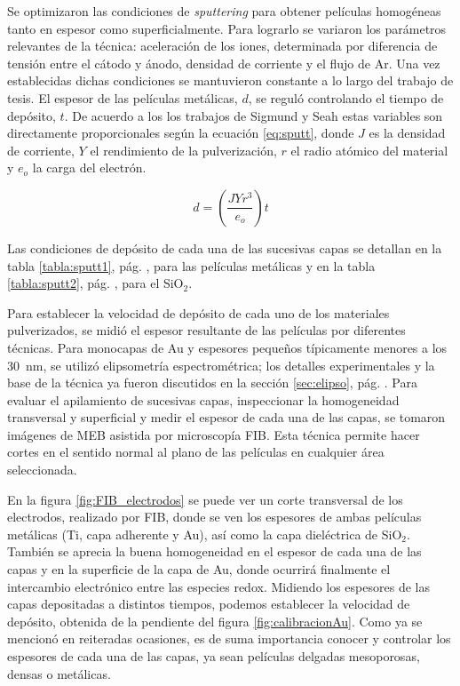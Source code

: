 {		 Se optimizaron las condiciones de \textit{sputtering} para obtener películas homogéneas tanto en espesor como superficialmente. Para lograrlo se variaron los parámetros relevantes de la técnica: aceleración de los iones, determinada por diferencia de tensión entre el cátodo y ánodo, densidad de corriente y el flujo de Ar. Una vez establecidas dichas condiciones se mantuvieron constante a lo largo del trabajo de tesis. El espesor de las películas metálicas, $d$, se reguló controlando el tiempo de depósito, $t$. De acuerdo a los los trabajos de Sigmund\cite{sigmund1968} y Seah\cite{Seah2005} estas variables son directamente proporcionales según la ecuación \ref{eq:sputt}, donde $J$ es la densidad de corriente, $Y$ el rendimiento de la pulverización, $r$ el radio atómico del material y $e_o$ la carga del electrón.

	 			\begin{equation}
	 				d=\left(\frac{JYr^3}{e_o}\right)t
	 				\label{eq:sputt}
	 			\end{equation}

		 Las condiciones de depósito de cada una de las sucesivas capas se detallan en la tabla \ref{tabla:sputt1}, pág. \pageref{tabla:sputt1}, para las películas metálicas y en la tabla  \ref{tabla:sputt2}, pág. \pageref{tabla:sputt2}, para el SiO$_2$. 

		 Para establecer la velocidad de depósito de cada uno de los materiales pulverizados, se midió el espesor resultante de las películas por diferentes técnicas. Para monocapas de Au y espesores pequeños típicamente menores a los \SI{30}{\nm}, se utilizó elipsometría espectrométrica; los detalles experimentales y la base de la técnica ya fueron discutidos en la sección \ref{sec:elipso}, pág. \pageref{sec:elipso}. Para evaluar el apilamiento de sucesivas capas, inspeccionar la homogeneidad transversal y superficial y medir el espesor de cada una de las capas, se tomaron imágenes de MEB asistida por microscopía FIB. Esta técnica permite hacer cortes en el sentido normal al plano de las películas en cualquier área seleccionada.
		
		 En la figura \ref{fig:FIB_electrodos} se puede ver un corte transversal de los electrodos, realizado por FIB, donde se ven los espesores de ambas películas metálicas (Ti, capa adherente y Au), así como la capa dieléctrica de SiO$_2$. También se aprecia la buena homogeneidad en el espesor de cada una de las capas y en la superficie de la capa de Au, donde ocurrirá finalmente el intercambio electrónico entre las especies redox. Midiendo los espesores de las capas depositadas a distintos tiempos, podemos establecer la velocidad de depósito, obtenida de la pendiente del figura \ref{fig:calibracionAu}. Como ya se mencionó en reiteradas ocasiones, es de suma importancia conocer y controlar los espesores de cada una de las capas, ya sean películas delgadas mesoporosas, densas o metálicas.


}
